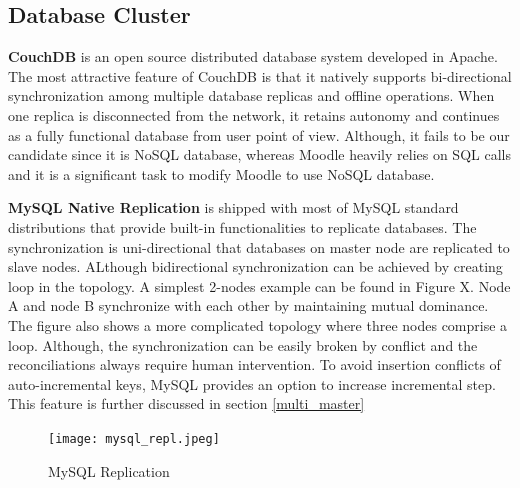 
\subsection{Database Cluster} \label{db_cluster}
\textbf{CouchDB}\cite{couchdb} is an open source distributed database system developed in Apache. The most attractive feature of CouchDB is that it natively supports bi-directional synchronization among multiple database replicas and offline operations. When one replica is disconnected from the network, it retains autonomy and continues as a fully functional database from user point of view. Although, it fails to be our candidate since it is NoSQL database, whereas Moodle heavily relies on SQL calls and it is a significant task to modify Moodle to use NoSQL database.

\textbf{MySQL Native Replication} is shipped with most of MySQL standard distributions that provide built-in functionalities to replicate databases. The synchronization is uni-directional that databases on master node are replicated to slave nodes. ALthough bidirectional synchronization can be achieved by creating loop in the topology. A simplest 2-nodes example can be found in Figure X. Node A and node B synchronize with each other by maintaining mutual dominance. The figure also shows a more complicated topology where three nodes comprise a loop. Although, the synchronization can be easily broken by conflict and the reconciliations always require human intervention.
To avoid insertion conflicts of auto-incremental keys, MySQL provides an option to increase incremental step. This feature is further discussed in section \ref{multi_master}

\begin{figure}[htbp]
\centering
\texttt{[image: mysql\_repl.jpeg]}
\caption{MySQL Replication}
\label{mysql_repl}
\end{figure}

